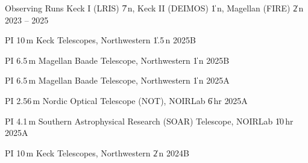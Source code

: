 


\begin{cventries}


\cvsimpentry
    {Observing Runs}
    {Keck I (LRIS) \| 7\,n, Keck II (DEIMOS) \| 1\,n, Magellan (FIRE) \| 2\,n}
    {2023 -- 2025}
    {}

\cvsimpentry
    {PI}
    {10\,m Keck Telescopes, Northwestern \| 1.5\,n}
    {2025B}
    {}

\cvsimpentry
    {PI}
    {6.5\,m Magellan Baade Telescope, Northwestern \| 1\,n}
    {2025B}
    {}

\cvsimpentry
    {PI}
    {6.5\,m Magellan Baade Telescope, Northwestern \| 1\,n}
    {2025A}
    {}

\cvsimpentry
    {PI}
    {2.56\,m Nordic Optical Telescope (NOT), NOIRLab \| 6\,hr}
    {2025A}
    {}

\cvsimpentry
    {PI}
    {4.1\,m Southern Astrophysical Research (SOAR) Telescope, NOIRLab \| 10\,hr}
    {2025A}
    {}
    
\cvsimpentry
    {PI}
    {10\,m Keck Telescopes, Northwestern \| 2\,n}
    {2024B}
    {}







\end{cventries}